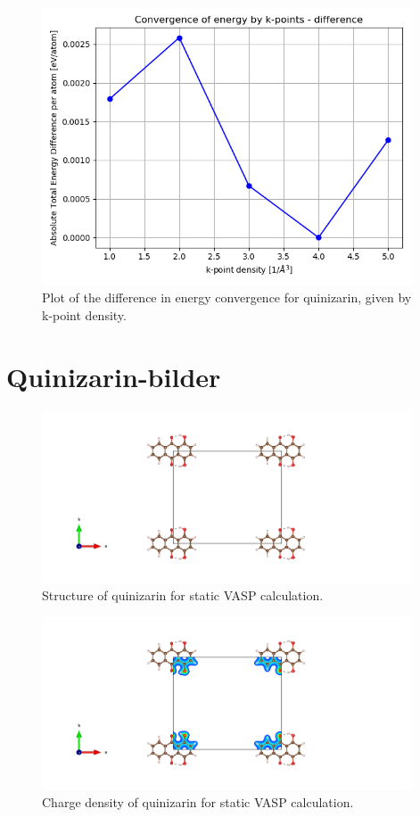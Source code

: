 \documentclass{article}
\begin{document}
  \begin{figure}[H]
      \centering
      \includegraphics[width = 11cm]{../fig/convergence_kpoints_difference.png}
      \caption{Plot of the difference in energy convergence for quinizarin, given by k-point density. }
      \label{fig:convergence_kpoints_difference.png}
  \end{figure}

\vspace{1cm}

\section{Quinizarin-bilder}

  \begin{figure}[H]
      \centering
      \includegraphics[width = 11cm]{../fig/basic_staticbefore_CONTCAR.png}
      \caption{Structure of quinizarin for static VASP calculation. }
      \label{fig:basic_staticbefore_CONTCAR}
  \end{figure}

  \begin{figure}[H]
      \centering
      \includegraphics[width = 11cm]{../fig/basic_staticbefore_CHGCAR.png}
      \caption{Charge density of quinizarin for static VASP calculation. }
      \label{fig:basic_staticbefore_CHGCAR}
  \end{figure}
\end{document}
